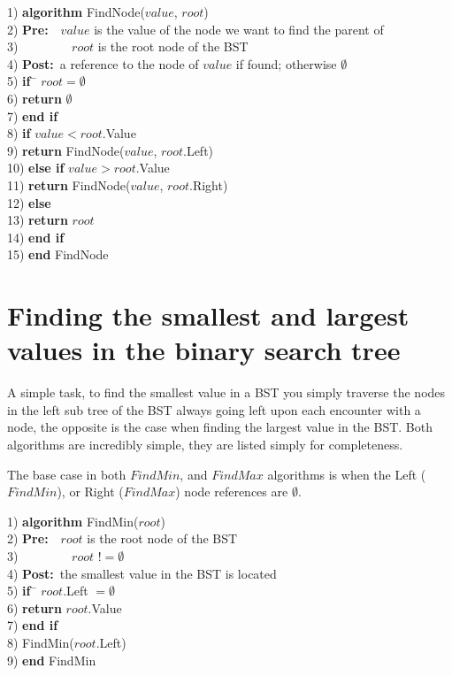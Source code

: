 \newpage
\begin{tabbing}
1)  \textbf{alg}\= \textbf{orithm} FindNode($value$, $root$) \\
2)  \> \textbf{Pre:}~~$value$ is the value of the node we want to find the parent of \\
3)  \> ~~~~~~~~$root$ is the root node of the BST \\
4)  \> \textbf{Post:}~a reference to the node of $value$ if found; otherwise $\emptyset$ \\
5)  \> \textbf{if}~\= $root = \emptyset$ \\
6)  \> \> \textbf{return} $\emptyset$ \\
7)  \> \textbf{end if} \\
8)  \> \textbf{if} $value < root$.Value \\
9)  \> \> \textbf{return} FindNode($value$, $root$.Left) \\
10) \> \textbf{else if} $value > root$.Value \\
11) \> \> \textbf{return} FindNode($value$, $root$.Right) \\
12) \> \textbf{else} \\
13) \> \> \textbf{return} $root$ \\
14) \> \textbf{end if} \\
15) \textbf{end} FindNode \\
\end{tabbing}

\section{Finding the smallest and largest values in the binary search tree}
A simple task, to find the smallest value in a BST you simply traverse the nodes in the left sub tree of the BST always going left upon each encounter with a node, the opposite is the case when finding the largest value in the BST. Both algorithms are incredibly simple, they are listed simply for completeness.

The base case in both $FindMin$, and $FindMax$ algorithms is when the Left ($FindMin$), or Right ($FindMax$) node references are $\emptyset$.

\begin{tabbing}
1)  \textbf{alg}\= \textbf{orithm} FindMin($root$) \\
2)  \> \textbf{Pre:}~~$root$ is the root node of the BST \\
3)  \> ~~~~~~~~$root$ $!= \emptyset$ \\
4)  \> \textbf{Post:}~the smallest value in the BST is located \\
5)  \> \textbf{if}~\= $root$.Left $= \emptyset$ \\
6)  \> \> \textbf{return} $root$.Value \\
7)  \> \textbf{end if} \\
8)  \> FindMin($root$.Left) \\
9)  \textbf{end} FindMin \\
\end{tabbing}


